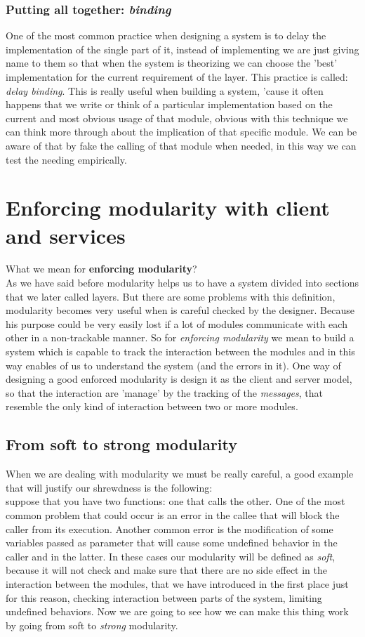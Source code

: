 \documentclass{article}
\begin{document}
  \subsubsection{Putting all together: \textit{binding}} 
    One of the most common practice when designing a system is to delay the implementation of 
    the single part of it, instead of implementing we are just giving name to them so that 
    when the system is theorizing we can choose the 'best' implementation for the current
    requirement of the layer. This practice is called: \textit{delay binding}. This is really 
    useful when building a system, 'cause it often happens that we write or think of a particular
    implementation based on the current and most obvious usage of that module, obvious with this 
    technique we can think more through about the implication of that specific module. We can 
    be aware of that by fake the calling of that module when needed, in this way we can test
    the needing empirically.
\section{Enforcing modularity with client and services}
  What we mean for \textbf{enforcing modularity}? \\ As we have said before modularity 
  helps us to have a system divided into sections that we later called layers. But
  there are some problems with this definition, modularity becomes very useful when
  is careful checked by the designer. Because his purpose could be very easily lost
  if a lot of modules communicate with each other in a non-trackable manner. So for 
  \textit{enforcing modularity} we mean to build a system which is capable to track the
  interaction between the modules and in this way enables of us to understand the system 
  (and the errors in it). One way of designing a good enforced modularity is design it 
  as the client and server model, so that the interaction are 'manage' by the tracking 
  of the \textit{messages}, that resemble the only kind of interaction between two or 
  more modules.
  \subsection{From soft to strong modularity}
    When we are dealing with modularity we must be really careful, a good example that will
    justify our shrewdness is the following: \\ suppose that you have two functions: one that 
    calls the other. One of the most common problem that could occur is an error in the callee 
    that will block the caller from its execution. Another common error is the modification of some
    variables passed as parameter that will cause some undefined behavior in the caller and in the
    latter. In these cases our modularity will be defined as \textit{soft}, because it will not 
    check and make sure that there are no side effect in the interaction between the modules, 
    that we have introduced in the first place just for this reason, checking interaction 
    between parts of the system, limiting undefined behaviors. Now we are going to 
    see how we can make this thing work by going from soft to \textit{strong} modularity.
\end{document}
